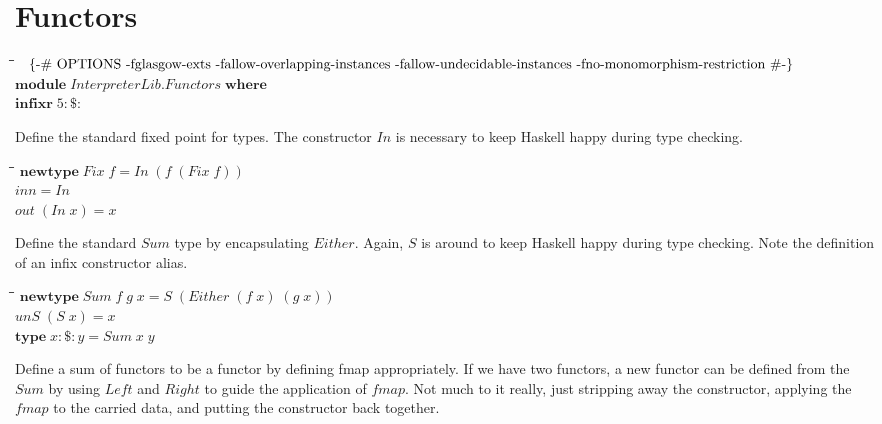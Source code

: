 \documentclass[10pt]{article}
\newlength{\lwidth}\setlength{\lwidth}{4.5cm}
\newlength{\cwidth}\setlength{\cwidth}{8mm} %
\newcommand{\Conid}[1]{\mathit{#1}}
\newcommand{\Varid}[1]{\mathit{#1}}
\begin{document}
\section{Functors}
\begin{tabbing}
\qquad\=\hspace{\lwidth}\=\hspace{\cwidth}\=\+\kill
${\mbox{\enskip\{-\# OPTIONS -fglasgow-exts -fallow-overlapping-instances -fallow-undecidable-instances -fno-monomorphism-restriction  \#-\}\enskip}}$\\
${\mathbf{module}\;\Conid{\Conid{InterpreterLib}.Functors}\;\mathbf{where}}$\\
${\mathbf{infixr}\;\mathrm{5}\mathbin{:\$:}}$
\end{tabbing}
Define the standard fixed point for types.  The constructor \ensuremath{\Conid{In}} is
necessary to keep Haskell happy during type checking.

\begin{tabbing}
\qquad\=\hspace{\lwidth}\=\hspace{\cwidth}\=\+\kill
${\mathbf{newtype}\;\Conid{Fix}\;\Varid{f}\mathrel{=}\Conid{In}\;(\Varid{f}\;(\Conid{Fix}\;\Varid{f}))}$\\
${\Varid{inn}\mathrel{=}\Conid{In}}$\\
${\Varid{out}\;(\Conid{In}\;\Varid{x})\mathrel{=}\Varid{x}}$
\end{tabbing}
Define the standard \ensuremath{\Conid{Sum}} type by encapsulating \ensuremath{\Conid{Either}}.  Again, \ensuremath{\Conid{S}}
is around to keep Haskell happy during type checking.  Note the
definition of an infix constructor alias.

\begin{tabbing}
\qquad\=\hspace{\lwidth}\=\hspace{\cwidth}\=\+\kill
${\mathbf{newtype}\;\Conid{Sum}\;\Varid{f}\;\Varid{g}\;\Varid{x}\mathrel{=}\Conid{S}\;(\Conid{Either}\;(\Varid{f}\;\Varid{x})\;(\Varid{g}\;\Varid{x}))}$\\
${\Varid{unS}\;(\Conid{S}\;\Varid{x})\mathrel{=}\Varid{x}}$\\
${\mathbf{type}\;\Varid{x}\mathbin{:\$:}\Varid{y}\mathrel{=}\Conid{Sum}\;\Varid{x}\;\Varid{y}}$
\end{tabbing}
Define a sum of functors to be a functor by defining fmap
appropriately.  If we have two functors, a new functor can be defined
from the \ensuremath{\Conid{Sum}} by using \ensuremath{\Conid{Left}} and \ensuremath{\Conid{Right}} to guide the application of
\ensuremath{\Varid{fmap}}.  Not much to it really, just stripping away the constructor,
applying the \ensuremath{\Varid{fmap}} to the carried data, and putting the constructor
back together.
\end{document}
